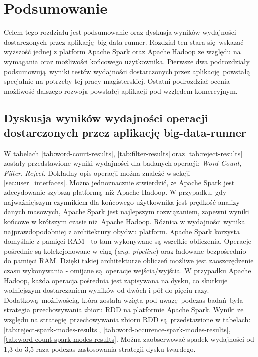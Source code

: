 \chapter{Podsumowanie} \label{chap.summary}
Celem tego rozdziału jest podsumowanie oraz dyskusja wyników wydajności dostarczonych przez aplikację big-data-runner. Rozdział ten stara się wskazać wyższość jednej z platform Apache Spark oraz Apache Hadoop ze względu na wymagania oraz możliwości końcowego użytkownika. Pierwsze dwa podrozdziały podsumowują wyniki testów wydajności dostarczonych przez aplikację powstałą specjalnie na potrzeby tej pracy magisterskiej. Ostatni podrozdział ocenia możliwość dalszego rozwoju powstałej aplikacji pod względem komercyjnym.   
\section{Dyskusja wyników wydajności operacji dostarczonych przez aplikację big-data-runner}
W tabelach \ref{tab:word-count-results}, \ref{tab:filter-results} oraz \ref{tab:reject-results} zostały przedstawione wyniki wydajności dla badanych operacji: \textit{Word Count}, \textit{Filter}, \textit{Reject}. Dokładny opis operacji można znaleźć w sekcji \ref{sec:user_interfaces}. Można jednoznacznie stwierdzić, że Apache Spark jest zdecydowanie szybszą platformą niż Apache Hadoop. W przypadku, gdy najważniejszym czynnikiem dla końcowego użytkownika jest prędkość analizy danych masowych, Apache Spark jest najlepszym rozwiązaniem, zapewni wyniki końcowe w krótszym czasie niż Apache Hadoop. Różnica w wydajności wynika najprawdopodobniej z architektury obydwu platform. Apache Spark korzysta domyślnie z pamięci RAM - to tam wykonywane są wszelkie obliczenia. Operacje pośrednie są kolekcjonowane w ciąg (\textit{ang. pipeline}) oraz ładowane bezpośrednio do pamięci RAM. Dzięki takiej architekturze obliczeń możliwe jest zaoszczędzenie czasu wykonywania - omijane są operacje wejścia/wyjścia. W przypadku Apache Hadoop, każda operacja pośrednia jest zapisywana na dysku, co skutkuje wolniejszym dostarczaniem wyników od dwóch i pół do pięciu razy. Dodatkową możliwością, która została wzięta pod uwagę podczas badań była strategia przechowywania zbioru RDD na platformie Apache Spark. Wyniki ze względu na strategię przechowywania zbioru RDD są przedstawione w tabelach: \ref{tab:reject-spark-modes-results}, \ref{tab:word-occurence-spark-modes-results}, \ref{tab:word-count-spark-modes-results}. Można zaobserwować spadek wydajności od 1,3 do 3,5 raza podczas zastosowania strategii dysku twardego. 
